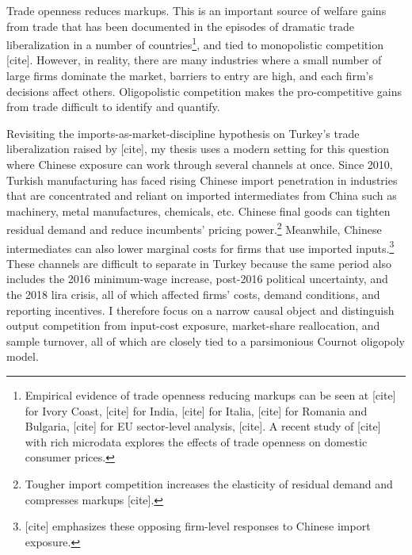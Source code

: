 \documentclass[12pt]{article}
\newcommand{\parencite}[2][]{[cite]}
\newcommand{\textcite}[2][]{[cite]}
\begin{document}
Trade openness reduces markups. This is an important source of welfare gains from trade that has been documented in the episodes of dramatic trade liberalization in a number of countries\footnote{Empirical evidence of trade openness reducing markups can be seen at \textcite{harrisonProductivityImperfectCompetition1994} for Ivory Coast, \textcite{krishnaTradeLiberalizationMarket1998} for India, \textcite{bottassoMarketPowerProductivity2001} for Italia, \textcite{koningsEffectsPrivatizationCompetitive2005} for Romania and Bulgaria, \textcite{chenDynamicsTradeCompetition2009} for EU sector-level analysis, \textcite{deloeckerMarkupsFirmLevelExport2012}. A recent study of \textcite{jaravelWhatArePrice} with rich microdata explores the effects of trade openness on domestic consumer prices.}, and tied to monopolistic competition \parencite{krugmanIncreasingReturnsMonopolistic1979,feenstraGlobalizationMarkupsUS2017,arkolakisElusiveProCompetitiveEffects2019}. However, in reality, there are many industries where a small number of large firms dominate the market, barriers to entry are high, and each firm's decisions affect others. Oligopolistic competition makes the pro-competitive gains from trade difficult to identify and quantify.

Revisiting the imports-as-market-discipline hypothesis on Turkey's trade liberalization raised by \textcite{levinsohnTestingImportsasmarketdisciplineHypothesis1993}, my thesis uses a modern setting for this question where Chinese exposure can work through several channels at once. Since 2010, Turkish manufacturing has faced rising Chinese import penetration in industries that are concentrated and reliant on imported intermediates from China such as machinery, metal manufactures, chemicals, etc. Chinese final goods can tighten residual demand and reduce incumbents' pricing power.\footnote{Tougher import competition increases the elasticity of residual demand and compresses markups \parencite{melitzMarketSizeTrade2008, edmondCompetitionMarkupsGains2015}.} Meanwhile, Chinese intermediates can also lower marginal costs for firms that use imported inputs.\footnote{\textcite{aghionOpposingFirmLevelResponses2024} emphasizes these opposing firm-level responses to Chinese import exposure.} These channels are difficult to separate in Turkey because the same period also includes the 2016 minimum-wage increase, post-2016 political uncertainty, and the 2018 lira crisis, all of which affected firms' costs, demand conditions, and reporting incentives. I therefore focus on a narrow causal object and distinguish output competition from input-cost exposure, market-share reallocation, and sample turnover, all of which are closely tied to a parsimonious Cournot oligopoly model.
\end{document}
